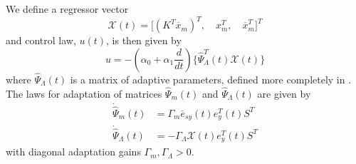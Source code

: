\documentclass[english]{ifacconf}
\begin{document}
We define a regressor vector 
\begin{equation}
\mathcal{X}(t) = \big[ (K^T \overline{x}_m)^T,\quad x_m^T,\quad \overline{x}_m^T \big]^T
\end{equation}
and control law, $u(t)$, is then given by
\begin{equation}
u = - (\alpha_0 + \alpha_1 \frac{d}{dt}) \big \{ \hat{\Psi}_{\Lambda}^T (t) \mathcal{X}(t) \big\}	
\end{equation}
where $\hat{\Psi}_{\Lambda}(t)$ is a matrix of adaptive parameters, defined more completely in \cite{qu2016adaptive}. The laws for adaptation of matrices $\hat{\Psi}_m(t)$ and $\hat{\Psi}_{\Lambda}(t)$ are given by
\begin{equation}
\begin{aligned}
	\dot{\hat{\Psi}}_m(t) &= \Gamma_{m} \overline{e}_{sy}(t) e_y^T(t) S^T \\
	\dot{\hat{\Psi}}_{\Lambda}(t) &= -\Gamma_{\Lambda} \mathcal{X}(t) e_y^T (t) S^T
\end{aligned}
\end{equation}
with diagonal adaptation gains $\Gamma_{m}, \Gamma_{\Lambda} > 0$.
\end{document}
